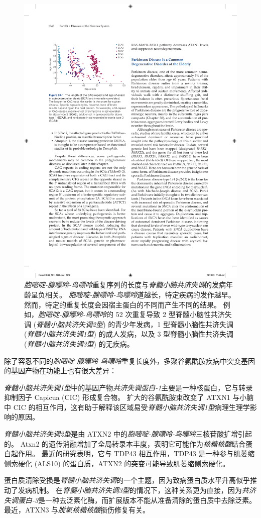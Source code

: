 \begin{figure}[htbp]
	\centering
	\includegraphics[width=0.5\linewidth]{chap63/fig_63_1}
	\caption{\textit{胞嘧啶-腺嘌呤-鸟嘌呤}重复序列的长度与\textit{脊髓小脑共济失调}的发病年龄呈负相关。
		\textit{胞嘧啶-腺嘌呤-鸟嘌呤}道越长，特定疾病的发作越早。
		然而，特定的重复长度会因宿主蛋白的不同而产生不同的结果。
		例如，\textit{胞嘧啶-腺嘌呤-鸟嘌呤}的 52 次重复导致 2 型脊髓小脑性共济失调 (\textit{脊髓小脑共济失调2型}) 的青少年发病，1 型脊髓小脑性共济失调 (\textit{脊髓小脑共济失调1型}) 的成人发病，以及 3 型脊髓小脑性共济失调 (\textit{脊髓小脑共济失调3型}) 的无疾病。}
	\label{fig:63_1}
\end{figure}


除了容忍不同的\textit{胞嘧啶-腺嘌呤-鸟嘌呤}重复长度外，多聚谷氨酰胺疾病中突变基因的基因产物在功能上也有很大差异：


\textit{脊髓小脑共济失调1型}中的基因产物\textit{共济失调蛋白-1}主要是一种核蛋白，它与转录抑制因子 Capicua (CIC) 形成复合物。
扩大的谷氨酰胺束改变了 ATXN1 与小脑中 CIC 的相互作用，这有助于解释该区域易受\textit{脊髓小脑共济失调1型}病理生理学影响的原因。


\textit{脊髓小脑共济失调2型}是由 ATXN2 中的\textit{胞嘧啶-腺嘌呤-鸟嘌呤}三核苷酸扩增引起的。
Atxn2 的遗传消融增加了全局转录本丰度，表明它可能作为\textit{核糖核酸}结合蛋白起作用。
最近的研究表明，它与 TDP43 相互作用，TDP43 是一种参与肌萎缩侧索硬化 (ALS10) 的蛋白质，ATXN2 的突变可能导致肌萎缩侧索硬化。


蛋白质清除受损是\textit{脊髓小脑共济失调}的一个主题，因为致病蛋白质水平升高似乎推动了发病机制。
在\textit{脊髓小脑共济失调3型}的情况下，这种关系更为直接，因为\textit{共济失调蛋白-3}是一种去泛素化酶，而扩展版本不能从准备清除的蛋白质中去除泛素。
最近，ATXN3 与\textit{脱氧核糖核酸}损伤修复有关。


